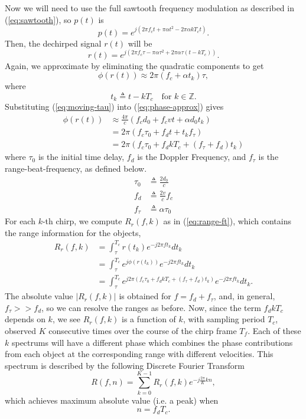 Now we will need to use the full sawtooth frequency modulation as described in
(\ref{eq:sawtooth}), so $p(t)$ is
\begin{equation}
	p(t) = e^{j(2\pi f_c t+ \pi \alpha t^2 - 2\pi\alpha kT_c t)}.
\end{equation}
Then, the dechirped signal $r(t)$ will be
\begin{equation}
	r(t) = e^{j(2\pi f_c \tau - \pi \alpha \tau^2 + 2\pi\alpha\tau (t-kT_c))}.
\end{equation}
Again, we approximate by eliminating the quadratic components to get
\begin{equation}
	\phi (r(t)) \approx 2\pi (f_c + \alpha t_k)\tau,
	\label{eq:phase-approx}
\end{equation}
where 
\begin{equation}
	t_k \triangleq t - kT_c \quad \text{for }k\in\mathbb{Z}.
\end{equation}
Substituting (\ref{eq:moving-tau}) into (\ref{eq:phase-approx}) gives
\begin{align}
	\phi (r(t)) &\approx \frac{4\pi}{c}(f_c d_0 + f_c vt + \alpha d_0 t_k)\\
	&= 2\pi (f_c \tau_0 + f_d t + t_k f_{\tau})\\
	&= 2\pi (f_c \tau_0 + f_d k T_c + (f_{\tau} + f_d) t_k)
\end{align}
where $\tau_0$ is the initial time delay, $f_d$ is the Doppler Frequency, and
$f_{\tau}$ is the range-beat-frequency, as defined below.
\begin{align}
	\tau_0 &\triangleq \frac{2d_0}{c}\\
	f_d &\triangleq \frac{2v}{c} f_c\\
	f_{\tau} &\triangleq \alpha\tau_0
\end{align}
For each $k$-th chirp, we compute $R_r(f,k)$ as in (\ref{eq:range-ft}), which
contains the range information for the objects,
\begin{align}
	R_r(f,k) &= \int_{\tau}^{T_c} r(t_k)e^{-j2\pi f t_k}dt_k\\
	&= \int_{\tau}^{T_c} e^{j\phi(r(t_k))}e^{-j2\pi f t_k}dt_k\\
	&= \int_{\tau}^{T_c} e^{j2\pi (f_c \tau_0 + f_d k T_c + (f_{\tau} + f_d) t_k)}e^{-j2\pi f t_k}dt_k.
\end{align}
The absolute value $|R_r(f,k)|$ is obtained for $f = f_d + f_\tau$, and, in
general, $f_\tau >> f_d$, so we can resolve the ranges as before.
Now, since the term $f_dkT_c$ depends on $k$, we see $R_r(f,k)$ is a 
function of $k$, with sampling period $T_c$, observed $K$ consecutive times over the course of the chirp frame
$T_f$. Each of these $k$ spectrums will have a different phase which combines the
phase contributions from each object at the corresponding range with different
velocities. This spectrum is described by the following Discrete Fourier Transform
\begin{equation}
	\label{eq:velocity-fft}
	R(f, n) = \sum_{k=0}^{K-1}R_r(f, k) e^{-j\frac{2\pi}{K}kn},
\end{equation}
which achieves maximum absolute value (i.e. a peak) when 
\begin{equation}
	n = f_d T_c.
\end{equation}

